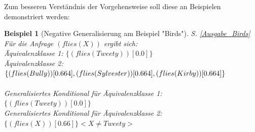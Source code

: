 \documentclass[draft]{scrreprt}
\newtheorem{Bsp}{Beispiel}[section]
\begin{document}
Zum besseren Verständnis der Vorgehensweise soll diese an Beispielen demonstriert werden:
\begin{Bsp}[Negative Generalisierung am Beispiel "{}Birds"{}]
	S. \ref{Ausgabe_Birds}
	\label{Bsp:Neg_Gen_Birds} \\Für die Anfrage $ (flies(X)) $ ergibt sich: \\
	
	\noindent
	Äquivalenzklasse 1: $\{(flies(Tweety))[0.0]\}$\\
	Äquivalenzklasse 2: $\{(flies(Bully))[0.664], (flies(Sylvester))[0.664],\\ (flies(Kirby))[0.664]\}$\\
	\\
Generalisiertes Konditional für Äquivalenzklasse 1:\\ $\{(flies(Tweety))[0.0]\}$\\
Generalisiertes Konditional für Äquivalenzklasse 2:\\ $\{(flies(X))[0.66]\} <X \neq Tweety>$\\
\end{Bsp}
 
\end{document}
